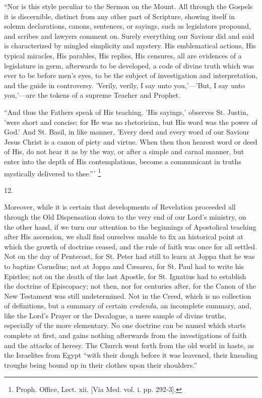 ``Nor is this style peculiar to the Sermon on the
Mount. All through the Gospels it is discernible,
distinct from any other part of Scripture, showing itself
in solemn declarations, canons, sentences, or sayings,
such as legislators propound, and scribes and lawyers
comment on. Surely everything our Saviour did and said is
characterized by mingled simplicity and mystery. His
emblematical actions, His typical miracles, His parables,
His replies, His censures, all are evidences of a
legislature in germ, afterwards to be developed, a code
of divine truth which was ever to be before men's eyes,
to be the subject of investigation and interpretation,
and the guide in controversy. 'Verily, verily, I say unto
you,'—'But, I say unto you,'—are the tokens of
a supreme Teacher and Prophet.

``And thus the Fathers speak of His teaching. 'His
sayings,' observes St. Justin, 'were short and concise;
for He was no rhetorician, but His word was the power of
God.' And St. Basil, in like manner, 'Every deed and
every word of our Saviour Jesus Christ is a canon of
piety and virtue. When then thou hearest word or deed of
His, do not hear it as by the way, or after a simple and
carnal manner, but enter into the depth of His
contemplations, become a communicant in truths mystically
delivered to thee.''' \footnote{Proph.
Office, Lect. xii. [Via
Med. vol. i. pp. 292-3].}

12.

Moreover, while it is certain that developments of
Revelation proceeded all through the Old Dispensation down to the very end of our Lord's ministry, on the other
hand, if we turn our attention to the beginnings of
Apostolical teaching after His ascension, we shall find
ourselves unable to fix an historical point at which the
growth of doctrine ceased, and the rule of faith was once
for all settled. Not on the day of Pentecost, for St.
Peter had still to learn at Joppa that he was to baptize
Cornelius; not at Joppa and Cæsarea, for St. Paul had to
write his Epistles; not on the death of the last Apostle,
for St. Ignatius had to establish the doctrine of
Episcopacy; not then, nor for centuries after, for the
Canon of the New Testament was still undetermined. Not in
the Creed, which is no collection of definitions, but a
summary of certain \emph{credenda}, an incomplete
summary, and, like the Lord's Prayer or the Decalogue, a
mere sample of divine truths, especially of the more
elementary. No one doctrine can be named which starts
complete at first, and gains nothing afterwards from the
investigations of faith and the attacks of heresy. The
Church went forth from the old world in haste, as the
Israelites from Egypt ``with their dough before it
was leavened, their kneading troughs being bound up in
their clothes upon their shoulders.''

